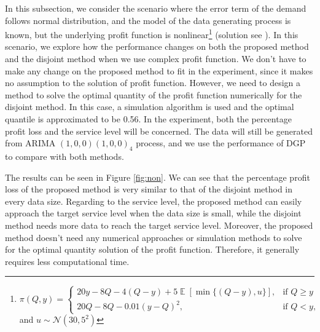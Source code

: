 \documentclass{article}
\DeclareMathOperator{\E}{\mathbb{E}}
\begin{document}
In this subsection, we consider the scenario where the error term of the demand follows normal distribution, and the model of the data generating process is known, but the underlying profit function is nonlinear\footnote{$
        \pi(Q,y)=
        \begin{cases}
            20y-8Q-4(Q-y)+5\E[\min \{(Q-y),u\}],& \text{if } Q\geq y\\
            20Q-8Q-0.01(y-Q)^2,& \text{if } Q< y,
        \end{cases}$ and $u\sim \mathcal{N}(30,5^2)$} (solution see \cite{KK18}).
In this scenario, we explore how the performance changes on both the proposed method and the disjoint method when we use complex profit function. We don't have to make any change on the proposed method to fit in the experiment, since it makes no assumption to the solution of profit function. However, we need to design a method to solve the optimal quantity of the profit function numerically for the disjoint method. In this case, a simulation algorithm is used and the optimal quantile is approximated to be 0.56. In the experiment, both the percentage profit loss and the service level will be concerned. The data will still be generated from ARIMA $(1,0,0)(1,0,0)_4$ process, and we use the performance of DGP to compare with both methods. 

The results can be seen in Figure \ref{fig:non}. We can see that the percentage profit loss of the proposed method is very similar to that of the disjoint method in every data size. Regarding to the service level, the proposed method can easily approach the target service level when the data size is small, while the disjoint method needs more data to reach the target service level. Moreover, the proposed method doesn't need any numerical approaches or simulation methods to solve for the optimal quantity solution of the profit function. Therefore, it generally requires less computational time.
\end{document}
